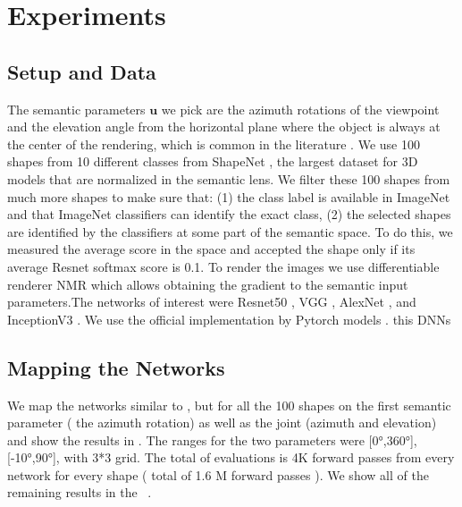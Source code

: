 \section{Experiments} \label{sec:experiments}
\subsection{Setup and Data} \label{sec:setup}
The semantic parameters $\mathbf{u}$ we pick are the azimuth rotations of the viewpoint and the elevation angle from the horizontal plane where the object is always at the center of the rendering, which is common in the literature \cite{sada,semantic-attack}. We use 100 shapes from 10 different classes from ShapeNet \cite{shapenet}, the largest dataset for 3D models that are normalized in the semantic lens. We filter these 100 shapes from much more shapes to make sure that: (1) the class label is available in ImageNet and that ImageNet classifiers can identify the exact class, (2) the selected shapes are identified by the classifiers at some part of the semantic space. To do this, we measured the average score in the space and accepted the shape only if its average Resnet softmax score is 0.1. To render the images we use differentiable renderer NMR \cite{vig-nmr} which allows obtaining the gradient to the semantic input parameters.The networks of interest were Resnet50 \cite{resnet}, VGG \cite{vgg}, AlexNet \cite{AlexNet}, and InceptionV3 \cite{inception}. We use the official implementation by Pytorch models \cite{paszke2017pytorch}. this DNNs 
\subsection{Mapping the Networks} \label{sec:maps}
We map the networks similar to \figLabel{\ref{fig:intro_fig}}, but for all the 100 shapes on the first semantic parameter ( the azimuth rotation) as well as the joint (azimuth and elevation) and show the results in \figLabel{\ref{fig:NMS}}. The ranges for the two parameters were [\ang{0},\ang{360}],[\ang{-10},\ang{90}], with 3*3 grid. The total of evaluations is 4K forward passes from every network for every shape ( total of 1.6 M forward passes ). We show all of the remaining results in the \supp ~.


